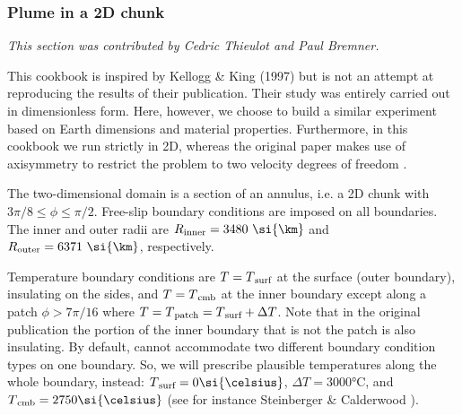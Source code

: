\subsubsection{Plume in a 2D chunk}
\label{sec:plume-2d-chunk}
\textit{This section was contributed by Cedric Thieulot and Paul Bremner.}

This cookbook is inspired by Kellogg \& King (1997) \cite{keki97} but is not an attempt at reproducing the results of their publication. Their study was entirely carried out in dimensionless form. Here, however, we choose to build a similar experiment based on Earth dimensions and material properties.
Furthermore, in this cookbook we run strictly in 2D, whereas the original paper makes use of axisymmetry to restrict the problem to two velocity degrees of freedom \cite{kiha92}.

The two-dimensional domain is a section of an annulus, i.e. a 2D chunk with $ 3\pi/8 \leq \phi \leq \pi/2$. Free-slip boundary conditions are imposed on all boundaries. The inner and outer radii are $R\textsubscript{inner}=3480~\si{\km}$ and $R\textsubscript{outer}=6371~\si{\km}$, respectively.

Temperature boundary conditions are $T=T\textsubscript{surf}$ at the surface (outer boundary), insulating on the sides, and $T=T\textsubscript{cmb}$ at the inner boundary except along a patch $\phi > 7\pi/16$ where $T=T\textsubscript{patch}=T\textsubscript{surf}+\Delta T$.
Note that in the original publication the portion of the inner boundary that is not the patch is also insulating. By default, \aspect{} cannot accommodate two different boundary condition types on one boundary. So, we will prescribe plausible temperatures along the whole boundary, instead: $T\textsubscript{surf}=0\si{\celsius}$, $\Delta T=3000\si{\celsius}$, and $T\textsubscript{cmb}=2750\si{\celsius}$ (see for instance Steinberger \& Calderwood \cite{stca06}).

